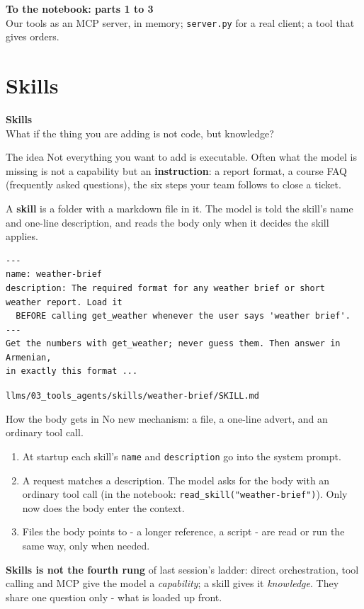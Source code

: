 \documentclass[aspectratio=169]{beamer}
\newcommand{\watchbox}[1]{%
  \begin{tcolorbox}[colback=armorange!12, colframe=armorange, boxrule=0.6pt, arc=2pt]
  #1
  \end{tcolorbox}}
\newcommand{\sectiontransition}[2]{%
  \begin{frame}[plain]
    \vfill
    \begin{center}
      {\Huge\bfseries\color{popblue} #1}\\[1.1em]
      {\large #2}
    \end{center}
    \vfill
  \end{frame}}
\newcommand{\notebookframe}[2]{%
  \begin{frame}[plain]
    \vfill
    \begin{center}
      {\Large\bfseries\color{paramgreen} To the notebook: #1}\\[1.0em]
      {\large #2}
    \end{center}
    \vfill
  \end{frame}}
\newcommand{\src}[1]{{\scriptsize\color{gray} #1}}
\begin{document}
\notebookframe{parts 1 to 3}{Our tools as an MCP server, in memory; \texttt{server.py} for a real client; a tool that gives orders.}

\section{Skills}
\sectiontransition{Skills}{What if the thing you are adding is not code, but knowledge?}

\begin{frame}[fragile]{The idea}
  \vspace{0.4em}
  Not everything you want to add is executable. Often what the model is missing is not a capability but an
  \textbf{instruction}: a report format, a course FAQ (frequently asked questions), the six steps your team follows
  to close a ticket.

  \vspace{0.5em}
  A \textbf{skill} is a folder with a markdown file in it. The model is told the skill's name and one-line
  description, and reads the body only when it decides the skill applies.

  \begin{lstlisting}[language=plaintext]
---
name: weather-brief
description: The required format for any weather brief or short weather report. Load it
  BEFORE calling get_weather whenever the user says 'weather brief'.
---
Get the numbers with get_weather; never guess them. Then answer in Armenian,
in exactly this format ...
\end{lstlisting}
  \src{\texttt{llms/03\_tools\_agents/skills/weather-brief/SKILL.md}}
\end{frame}

\begin{frame}{How the body gets in}
  \vspace{0.2em}
  {\small No new mechanism: a file, a one-line advert, and an ordinary tool call.}

  \vspace{0.3em}
  \begin{enumerate}
    \item[\textbf{1.}] At startup each skill's \texttt{name} and \texttt{description} go into the system
      prompt.
    \item[\textbf{2.}] A request matches a description. The model asks for the body with an ordinary tool call
      (in the notebook: \texttt{read\_skill("weather-brief")}). Only now does the body enter the context.
    \item[\textbf{3.}] Files the body points to - a longer reference, a script - are read or run the same way,
      only when needed.
  \end{enumerate}

  \vspace{0.3em}
  \watchbox{\small \textbf{Skills is not the fourth rung} of last session's ladder: direct orchestration, tool
  calling and MCP give the model a \emph{capability}; a skill gives it \emph{knowledge}. They share one question
  only - what is loaded up front.}
\end{frame}
\end{document}
